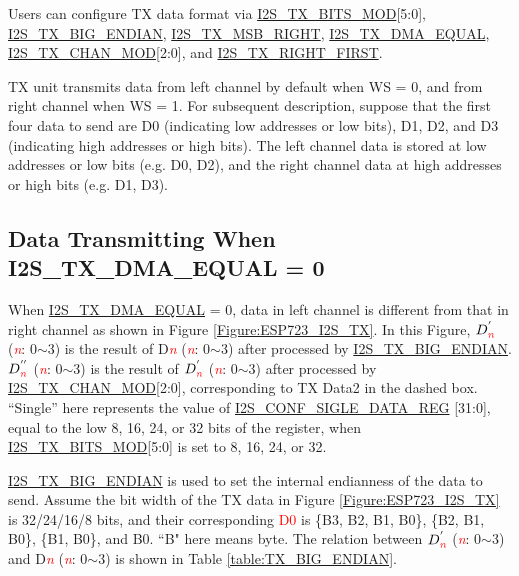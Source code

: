 \documentclass[main\_\_EN.tex]{subfiles}
\begin{document}
Users can configure TX data format via \hyperref[fielddesc:I2STXBITSMOD]{I2S\_TX\_BITS\_MOD}[5:0], \hyperref[fielddesc:I2STXBIGENDIAN]{I2S\_TX\_BIG\_ENDIAN}, \hyperref[fielddesc:I2STXMSBRIGHT]{I2S\_TX\_MSB\_RIGHT}, \hyperref[fielddesc:I2STXDMAEQUAL]{I2S\_TX\_DMA\_EQUAL}, \hyperref[fielddesc:I2STXCHANMOD]{I2S\_TX\_CHAN\_MOD}[2:0], and \hyperref[fielddesc:I2STXRIGHTFIRST]{I2S\_TX\_RIGHT\_FIRST}.

TX unit transmits data from left channel by default when WS = 0, and from right channel when WS = 1. For subsequent description, suppose that the first four data to send are D0 (indicating low addresses or low bits), D1, D2, and D3 (indicating high addresses or high bits). The left channel data is stored at low addresses or low bits (e.g. D0, D2), and the right channel data at high addresses or high bits (e.g. D1, D3).


\subsection{Data Transmitting When I2S\_TX\_DMA\_EQUAL = 0}

When \hyperref[fielddesc:I2STXDMAEQUAL]{I2S\_TX\_DMA\_EQUAL} = 0, data in left channel is different from that in right channel as shown in Figure \ref{Figure:ESP723_I2S_TX}. In this Figure, $D^{'}_{\textcolor{red}{\it{n}}}$ (\textcolor{red}{\it{n}}: 0$ \sim $3) is the result of D\textcolor{red}{\it{n}} (\textcolor{red}{\it{n}}: 0$ \sim $3) after processed by \hyperref[fielddesc:I2STXBIGENDIAN]{I2S\_TX\_BIG\_ENDIAN}. $D^{''}_{\textcolor{red}{\it{n}}}$ (\textcolor{red}{\it{n}}: 0$ \sim $3) is the result of $D^{'}_{\textcolor{red}{\it{n}}}$ (\textcolor{red}{\it{n}}: 0$ \sim $3) after processed by \hyperref[fielddesc:I2STXCHANMOD]{I2S\_TX\_CHAN\_MOD}[2:0], corresponding to TX Data2 in the dashed box. ``Single” here represents the value of \hyperref[regdesc:I2SCONFSIGLEDATAREG]{I2S\_CONF\_SIGLE\_DATA\_REG} [31:0], equal to the low 8, 16, 24, or 32 bits of the register, when \hyperref[fielddesc:I2STXBITSMOD]{I2S\_TX\_BITS\_MOD}[5:0] is set to 8, 16, 24, or 32.

\hyperref[fielddesc:I2STXBIGENDIAN]{I2S\_TX\_BIG\_ENDIAN} is used to set the internal endianness of the data to send. Assume the bit width of the TX data in Figure \ref{Figure:ESP723_I2S_TX} is 32/24/16/8 bits, and their corresponding \textcolor{red}{D0} is \{B3, B2, B1, B0\}, \{B2, B1, B0\}, \{B1, B0\}, and B0. ``B" here means byte. The relation between $D^{'}_{\textcolor{red}{\it{n}}}$ (\textcolor{red}{\it{n}}: 0$ \sim $3) and D\textcolor{red}{\it{n}} (\textcolor{red}{\it{n}}: 0$ \sim $3) is shown in Table \ref{table:TX_BIG_ENDIAN}.
\end{document}
